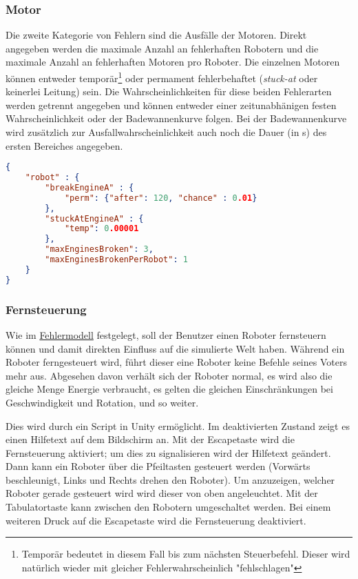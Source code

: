 \subsubsection{Motor}
Die zweite Kategorie von Fehlern sind die Ausf{\"{a}}lle der Motoren. Direkt angegeben werden die maximale
Anzahl an fehlerhaften Robotern und die maximale Anzahl an fehlerhaften Motoren pro Roboter.
Die einzelnen Motoren k{\"{o}}nnen entweder tempor{\"{a}}r\footnote{Tempor{\"{a}}r bedeutet
in diesem Fall bis zum n{\"{a}}chsten Steuerbefehl. Dieser wird nat{\"{u}}rlich wieder mit
gleicher Fehlerwahrscheinlich "fehlschlagen"} oder permament fehlerbehaftet (\textit{stuck-at}
oder keinerlei Leitung) sein. Die Wahrscheinlichkeiten f{\"{u}}r diese beiden Fehlerarten werden getrennt
angegeben und k{\"{o}}nnen entweder einer zeitunabh{\"{a}}nigen festen Wahrscheinlichkeit oder der
Badewannenkurve folgen. Bei der Badewannenkurve wird zus{\"{a}}tzlich zur Ausfallwahrscheinlichkeit auch
noch die Dauer (in s) des ersten Bereiches angegeben.
\begin{lstlisting}[frame=single, language=json] 
{
	"robot" : {
		"breakEngineA" : {
			"perm": {"after": 120, "chance" : 0.01}
		},
		"stuckAtEngineA" : {
			"temp": 0.00001
		},
		"maxEnginesBroken": 3,
		"maxEnginesBrokenPerRobot": 1
	}
}
\end{lstlisting}


\subsubsection{Fernsteuerung}
Wie im \hyperref[fm]{Fehlermodell} festgelegt, soll der Benutzer einen Roboter fernsteuern k{\"{o}}nnen
und damit direkten Einfluss auf die simulierte Welt haben. W{\"{a}}hrend ein Roboter ferngesteuert wird, 
f{\"{u}}hrt dieser eine Roboter keine Befehle seines Voters mehr aus. Abgesehen davon verh{\"{a}}lt sich der
Roboter normal, es wird also die gleiche Menge Energie verbraucht, es gelten die gleichen
Einschr{\"{a}}nkungen bei Geschwindigkeit und Rotation, und so weiter.

Dies wird durch ein Script in Unity erm{\"{o}}glicht. Im deaktivierten Zustand zeigt es einen Hilfetext
auf dem Bildschirm an. Mit der Escapetaste wird die Fernsteuerung aktiviert; um dies zu signalisieren wird
der Hilfetext ge{\"{a}}ndert. Dann kann ein Roboter {\"{u}}ber die Pfeiltasten gesteuert werden
(Vorw{\"{a}}rts beschleunigt, Links und Rechts drehen den Roboter). Um anzuzeigen, welcher Roboter
gerade gesteuert wird wird dieser von oben angeleuchtet. Mit der Tabulatortaste kann zwischen den
Robotern umgeschaltet werden. Bei einem weiteren Druck auf die Escapetaste wird die Fernsteuerung deaktiviert.



